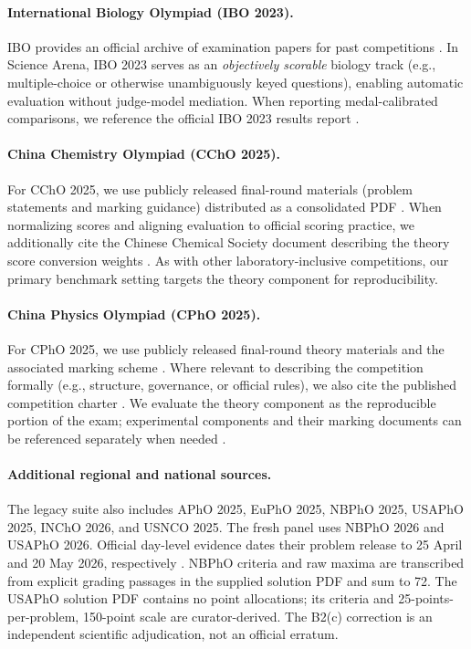 \documentclass[11pt]{article}
\begin{document}
\paragraph{International Biology Olympiad (IBO 2023).}
IBO provides an official archive of examination papers for past competitions \citep{ibo_papers_archive}. In Science Arena, IBO 2023 serves as an \emph{objectively scorable} biology track (e.g., multiple-choice or otherwise unambiguously keyed questions), enabling automatic evaluation without judge-model mediation. When reporting medal-calibrated comparisons, we reference the official IBO 2023 results report \citep{ibo2023_final_results}.

\paragraph{China Chemistry Olympiad (CChO 2025).}
For CChO 2025, we use publicly released final-round materials (problem statements and marking guidance) distributed as a consolidated PDF \citep{ccho2025_final_theory_paper_public_pdf}. When normalizing scores and aligning evaluation to official scoring practice, we additionally cite the Chinese Chemical Society document describing the theory score conversion weights \citep{ccho2025_theory_weighting_chemsoc}. As with other laboratory-inclusive competitions, our primary benchmark setting targets the theory component for reproducibility.

\paragraph{China Physics Olympiad (CPhO 2025).}
For CPhO 2025, we use publicly released final-round theory materials and the associated marking scheme \citep{cpho2025_final_theory_paper_public_pdf,cpho2025_final_theory_solution_marking_public_pdf}. Where relevant to describing the competition formally (e.g., structure, governance, or official rules), we also cite the published competition charter \citep{cpho_charter_2025_revision}. We evaluate the theory component as the reproducible portion of the exam; experimental components and their marking documents can be referenced separately when needed \citep{cpho2025_final_practical_paper_public_pdf,cpho2025_final_practical_answer_key_public_pdf}.

\paragraph{Additional regional and national sources.}
The legacy suite also includes APhO 2025, EuPhO 2025, NBPhO 2025, USAPhO 2025, INChO 2026, and USNCO 2025. The fresh panel uses NBPhO 2026 and USAPhO 2026. Official day-level evidence dates their problem release to 25 April and 20 May 2026, respectively \citep{nbpho2026_official_event,nbpho2026_media_metadata,usapho2026_official_news}. NBPhO criteria and raw maxima are transcribed from explicit grading passages in the supplied solution PDF and sum to 72. The USAPhO solution PDF contains no point allocations; its criteria and 25-points-per-problem, 150-point scale are curator-derived. The B2(c) correction is an independent scientific adjudication, not an official erratum.
\end{document}
